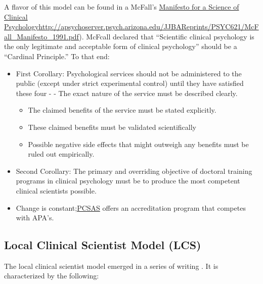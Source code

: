 \documentclass[
  english,
]{book}
\providecommand{\tightlist}{%
  \setlength{\itemsep}{0pt}\setlength{\parskip}{0pt}}
\begin{document}
A flavor of this model can be found in a McFall's \citeyearpar{mcfall_manifesto_1991} \href{http://www.psychologicalscience.org/observer/0102/apcs_manifesto.html}{Manifesto for a Science of Clinical Psychology}\url{http://apsychoserver.psych.arizona.edu/JJBAReprints/PSYC621/McFall_Manifesto_1991.pdf}). McFcall declared that ``Scientific clinical psychology is the only legitimate and acceptable form of clinical psychology'' should be a ``Cardinal Principle.'' To that end:

\begin{itemize}
\tightlist
\item
  First Corollary: Psychological services should not be administered to the public (except under strict experimental control) until they have satisfied these four - - The exact nature of the service must be described clearly.

  \begin{itemize}
  \tightlist
  \item
    The claimed benefits of the service must be stated explicitly.
  \item
    These claimed benefits must be validated scientifically
  \item
    Possible negative side effects that might outweigh any benefits must be ruled out empirically.
  \end{itemize}
\item
  Second Corollary: The primary and overriding objective of doctoral training programs in clinical psychology must be to produce the most competent clinical scientists possible.
\item
  Change is constant;\href{https://www.pcsas.org/}{PCSAS} offers an accreditation program that competes with APA's.
\end{itemize}

\hypertarget{local-clinical-scientist-model-lcs}{%
\subsection{Local Clinical Scientist Model (LCS)}\label{local-clinical-scientist-model-lcs}}

The local clinical scientist model emerged in a series of writing \citep{stricker_are_1997, stricker_local_1995, stricker_local_2006, trierweiler_research_2010, trierweiler_scientific_1998}. It is characterized by the following:
\end{document}
